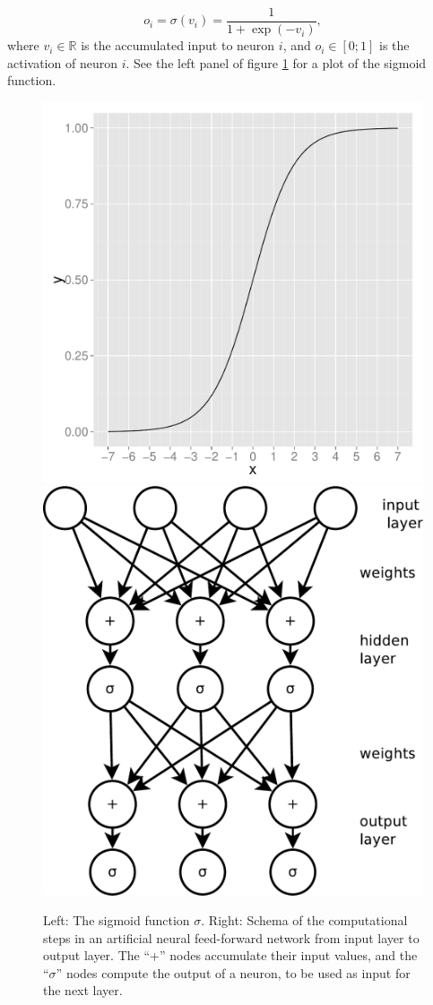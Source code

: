 \begin{equation}
o_{i}=\sigma(v_{i})=\frac{1}{1+\exp(-v_{i})},\label{eq:sigmoid-function}
\end{equation}
where $v_{i}\in\mathbb{R}$ is the accumulated input to neuron $i$,
and $o_{i}\in[0;1]$ is the activation of neuron $i$. See the left
panel of figure \ref{fig:sigmoid-function} for a plot of the sigmoid
function.
\begin{figure}
\begin{centering}
\includegraphics[width=0.45\columnwidth]{images/plot-sigmoid}\hfill{}\includegraphics[width=0.45\columnwidth]{images/neuronal-network-example}
\par\end{centering}
\caption{\label{fig:sigmoid-function}Left: The sigmoid function $\sigma$.
Right: Schema of the computational steps in an artificial neural feed-forward
network from input layer to output
layer. The ``+'' nodes accumulate their input values, and the ``$\sigma$''
nodes compute the output of a neuron, to be used as input for the
next layer.}
\end{figure}

